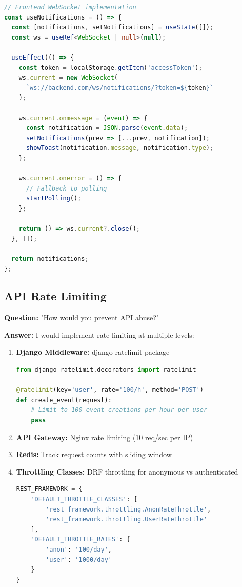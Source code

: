 \documentclass[11pt,a4paper]{article}
\begin{document}
\begin{lstlisting}[language=TypeScript]
// Frontend WebSocket implementation
const useNotifications = () => {
  const [notifications, setNotifications] = useState([]);
  const ws = useRef<WebSocket | null>(null);
  
  useEffect(() => {
    const token = localStorage.getItem('accessToken');
    ws.current = new WebSocket(
      `ws://backend.com/ws/notifications/?token=${token}`
    );
    
    ws.current.onmessage = (event) => {
      const notification = JSON.parse(event.data);
      setNotifications(prev => [...prev, notification]);
      showToast(notification.message, notification.type);
    };
    
    ws.current.onerror = () => {
      // Fallback to polling
      startPolling();
    };
    
    return () => ws.current?.close();
  }, []);
  
  return notifications;
};
\end{lstlisting}

\subsection{API Rate Limiting}
\textbf{Question:} "How would you prevent API abuse?"

\textbf{Answer:} I would implement rate limiting at multiple levels:

\begin{enumerate}[leftmargin=*]
    \item \textbf{Django Middleware:} django-ratelimit package
    \begin{lstlisting}[language=Python]
from django_ratelimit.decorators import ratelimit

@ratelimit(key='user', rate='100/h', method='POST')
def create_event(request):
    # Limit to 100 event creations per hour per user
    pass
    \end{lstlisting}
    
    \item \textbf{API Gateway:} Nginx rate limiting (10 req/sec per IP)
    \item \textbf{Redis:} Track request counts with sliding window
    \item \textbf{Throttling Classes:} DRF throttling for anonymous vs authenticated
    \begin{lstlisting}[language=Python]
REST_FRAMEWORK = {
    'DEFAULT_THROTTLE_CLASSES': [
        'rest_framework.throttling.AnonRateThrottle',
        'rest_framework.throttling.UserRateThrottle'
    ],
    'DEFAULT_THROTTLE_RATES': {
        'anon': '100/day',
        'user': '1000/day'
    }
}
    \end{lstlisting}
\end{enumerate}
\end{document}

